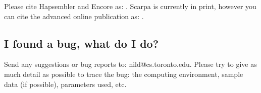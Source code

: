 \documentclass[12pt,a4paper]{report}
\begin{document}
Please cite Hapsembler and Encore as: \cite{donmez11}. Scarpa is currently in print, however you can cite the advanced online publication as: \cite{donmez12}.

\subsection{I found a bug, what do I do?}

Send any suggestions or bug reports to: nild@cs.toronto.edu. Please try to give as much detail as possible to trace the bug: the computing environment, sample data (if possible), parameters used, etc.



\end{document}
